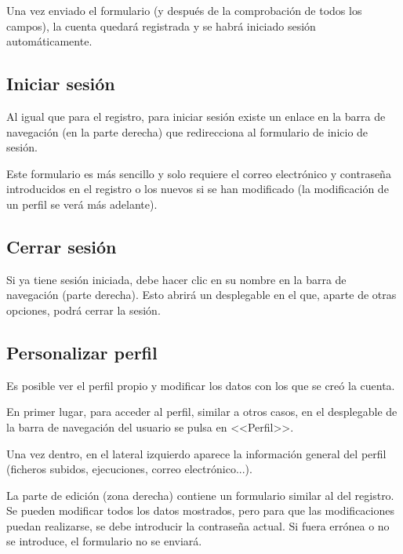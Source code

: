 
Una vez enviado el formulario (y después de la comprobación de todos los
campos), la cuenta quedará registrada y se habrá iniciado sesión
automáticamente.

\subsection{Iniciar sesión}

Al igual que para el registro, para iniciar sesión existe un enlace en la barra
de navegación (en la parte derecha) que redirecciona al formulario de inicio de
sesión.


Este formulario es más sencillo y solo requiere el correo electrónico y
contraseña introducidos en el registro o los nuevos si se han modificado (la
modificación de un perfil se verá más adelante).

\subsection{Cerrar sesión}

Si ya tiene sesión iniciada, debe hacer clic en su nombre en la barra de
navegación (parte derecha). Esto abrirá un desplegable en el que, aparte de
otras opciones, podrá cerrar la sesión.


\subsection{Personalizar perfil}

Es posible ver el perfil propio y modificar los datos con los que se creó la
cuenta.

En primer lugar, para acceder al perfil, similar a otros casos, en el
desplegable de la barra de navegación del usuario se pulsa en <<Perfil>>.


Una vez dentro, en el lateral izquierdo aparece la información general del
perfil (ficheros subidos, ejecuciones, correo electrónico...).

La parte de edición (zona derecha) contiene un formulario similar al del
registro. Se pueden modificar todos los datos mostrados, pero para que las
modificaciones puedan realizarse, se debe introducir la contraseña actual. Si
fuera errónea o no se introduce, el formulario no se enviará.

